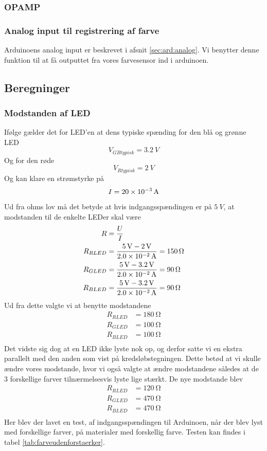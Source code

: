 \subsubsection{OPAMP}
\subsubsection{Analog input til registrering af farve}
Arduinoens analog input er beskrevet i afsnit \ref{sec:ard:analog}. Vi benytter denne funktion til at få outputtet fra vores farvesensor ind i arduinoen.
\subsection{Beregninger}
\subsubsection{Modstanden af LED}
Ifølge \cite{kompLED} gælder det for LED'en at dens typiske spænding for den blå og grønne LED
\[
	V_{GB typisk} = \SI{3.2}{V}
\]
Og for den røde 
\[
	V_{R typisk} = \SI{2}{V}
\]
Og kan klare en strømstyrke på
\[
	I = \SI{20d-3}{A} 
\]
Ud fra ohms lov må det betyde at hvis indgangsspændingen er på $\SI{5}{V}$, at modstanden til de enkelte LEDer skal være
\begin{align}
	R&= \frac{U}{I}\\
	R_{RLED} &= \frac{\SI{5}{V}-\SI{2}{V}}{\SI{2.0d-2}{A}} = \SI{150}{\ohm}\\
	R_{GLED} &= \frac{\SI{5}{V}-\SI{3.2}{V}}{\SI{2.0d-2}{A}} = \SI{90}{\ohm}\\
	R_{BLED} &= \frac{\SI{5}{V}-\SI{3.2}{V}}{\SI{2.0d-2}{A}} = \SI{90}{\ohm}\\
\end{align}
Ud fra dette valgte vi at benytte modstandene 
\begin{align}
	R_{RLED} &= \SI{180}{\ohm}\\
	R_{GLED} &= \SI{100}{\ohm}\\
	R_{BLED} &= \SI{100}{\ohm}\\
\end{align}
Det vidste sig dog at en LED ikke lyste nok op, og derfor satte vi en ekstra parallelt med den anden som vist på kredsløbstegningen. Dette betød at vi skulle ændre vores modstande, hvor vi også valgte at ændre modstandene således at de 3 forskellige farver tilnærmelsesvis lyste lige stærkt. De nye modstande blev 
\begin{align}
	R_{RLED} &= \SI{120}{\ohm}\\
	R_{GLED} &= \SI{470}{\ohm}\\
	R_{BLED} &= \SI{470}{\ohm}\\
\end{align}
Her blev der lavet en test, af indgangsspændingen til Arduinoen, når der blev lyst med forskellige farver, på materialer med forskellig farve. Testen kan findes i tabel \ref{tab:farveudenforstaerker}.


